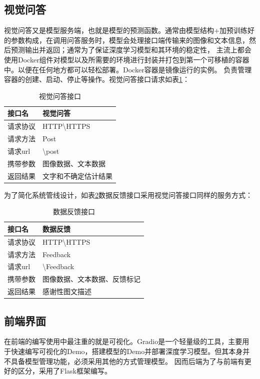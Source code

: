 \subsection{视觉问答}
视觉问答又是模型服务端，也就是模型的预测函数。通常由模型结构+加预训练好的参数构成，在调用问答服务时，模型会处理接口端传输来的图像和文本信息，然后预测输出并返回；通常为了保证深度学习模型和其环境的稳定性，
主流上都会使用Docker组件对模型以及所需要的环境进行封装并打包到第一个可移植的容器中。以便在任何地方都可以轻松部署。Docker容器是镜像运行的实例。
负责管理容器的创建、启动、停止等操作。视觉问答接口请求如表\ref{tab:linkvqa}：
\begin{table}
    \caption{\label{tab:linkvqa}视觉问答接口}
    \centering
    \begin{tabular}{l|l}
        \hline 接口名 & 视觉问答 \\
        \hline 请求协议 & HTTP\textbackslash HTTPS \\
		请求方法 & Post \\
		请求url & \textbackslash post \\
		携带参数 & 图像数据、文本数据 \\
		返回结果 & 文字和不确定估计结果 \\
        \hline
        \end{tabular}
\end{table}	

为了简化系统管线设计，如表\ref{tab:linkfeedback}数据反馈接口采用视觉问答接口同样的服务方式：
\begin{table}
    \caption{\label{tab:linkfeedback}数据反馈接口}
    \centering
    \begin{tabular}{l|l}
        \hline 接口名 & 数据反馈 \\
        \hline 请求协议 & HTTP\textbackslash HTTPS \\
		请求方法 & Feedback \\
		请求url & \textbackslash Feedback \\
		携带参数 & 图像数据、文本数据、反馈标记 \\
		返回结果 & 感谢性图文描述 \\
        \hline
        \end{tabular}
\end{table}	

\subsection{前端界面}
在前端的编写使用中最注重的就是可视化。Gradio是一个轻量级的工具，主要用于快速编写可视化的Demo，搭建模型的Demo并部署深度学习模型。但其本身并不具备模型管理功能，必须采用其他的方式管理模型。
因而后端为了与前端有更好的区分，采用了Flask框架编写。

